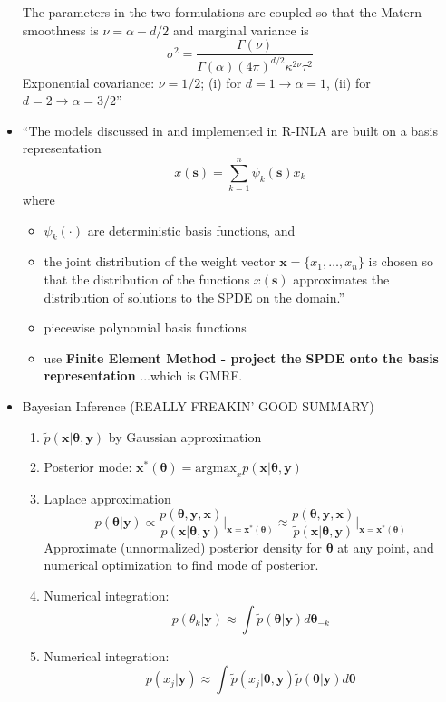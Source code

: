 \documentclass{article}
\begin{document}
\begin{itemize}
The parameters in the two formulations are coupled so that the Matern smoothness is $\nu = \alpha - d/2$ and marginal variance is
$$\sigma^{2} = \frac{\Gamma(\nu)}{\Gamma(\alpha)(4\pi)^{d/2}\kappa^{2\nu}\tau^{2}}$$
Exponential covariance: $\nu = 1/2$; (i) for $d = 1 \rightarrow  \alpha = 1$, (ii) for $d = 2 \rightarrow \alpha = 3/2$''
\item ``The models discussed in \cite{Lindgren2011} and implemented in R-INLA are built on a basis representation
$$ x(\pmb{s}) = \sum_{k=1}^{n} \psi_{k}(\pmb{s})x_{k}$$
where
      \begin{itemize}
      \item $\psi_{k}(\cdot)$ are deterministic basis functions, and
      \item the joint distribution of the weight vector $\pmb{x} = \{x_{1},\dots,x_{n}\}$ is chosen so that the distribution of the functions $x(\pmb{s})$ approximates the distribution of solutions to the SPDE on the domain.''
      \item piecewise polynomial basis functions
      \item use {\bf Finite Element Method - project the SPDE onto the basis representation} ...which is GMRF. \citep{Simpson2012}
      \end{itemize}
\item Bayesian Inference (REALLY FREAKIN' GOOD SUMMARY)
        \begin{enumerate}
        \item $\tilde{p}(\pmb{x}|\pmb{\theta, y})$ by Gaussian approximation
        \item Posterior mode: $\pmb{x}^{*}(\pmb{\theta}) = \text{argmax}_{x}p(\pmb{x}|\pmb{\theta, y})$
        \item Laplace approximation
        $$ p(\pmb{\theta} | \pmb{y}) \propto \frac{p(\pmb{\theta, y, x})}{p(\pmb{x}|\pmb{\theta, y})} \Big|_{\pmb{x} = \pmb{x}^{*}(\pmb{\theta})} \approx \frac{p(\pmb{\theta, y, x})}{\tilde{p}(\pmb{x}|\pmb{\theta, y})} \Big|_{\pmb{x} = \pmb{x}^{*}(\pmb{\theta})}$$
        Approximate (unnormalized) posterior density for $\pmb{\theta}$ at any point, and numerical optimization to find mode of posterior.
        \item Numerical integration:
        $$ p(\theta_{k} | \pmb{y}) \approx \int \tilde{p}(\pmb{\theta}|\pmb{y}) d\pmb{\theta}_{-k} $$
        \item Numerical integration:
        $$ p(x_{j} | \pmb{y}) \approx \int \tilde{p}(x_{j}|\pmb{\theta, y})\tilde{p}(\pmb{\theta}|\pmb{y}) d\pmb{\theta} $$
        \end{enumerate}
\end{itemize}
\end{document}
